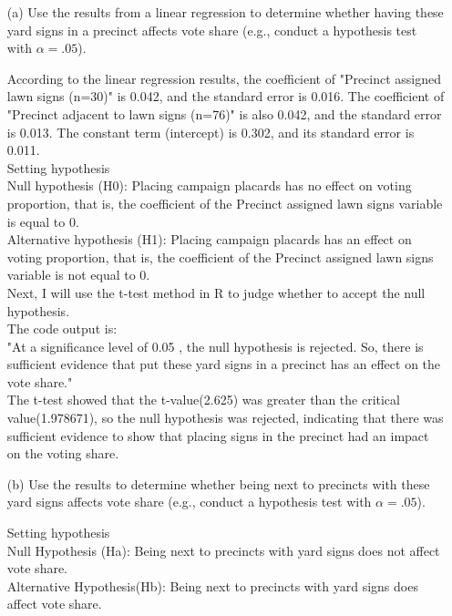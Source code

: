 \documentclass[12pt,letterpaper]{article}
\begin{document}
\vspace{.5cm}
\begin{enumerate}
	\item [(a)] Use the results from a linear regression to determine whether having these yard signs in a precinct affects vote share (e.g., conduct a hypothesis test with $\alpha = .05$).
	
	According to the linear regression results, the coefficient of "Precinct assigned lawn signs (n=30)" is 0.042, and the standard error is 0.016. The coefficient of "Precinct adjacent to lawn signs (n=76)" is also 0.042, and the standard error is 0.013. The constant term (intercept) is 0.302, and its standard error is 0.011.\\
	
	{\large Setting hypothesis\\}
	Null hypothesis (H0): Placing campaign placards has no effect on voting proportion, that is, the coefficient of the Precinct assigned lawn signs variable is equal to 0.\\
	Alternative hypothesis (H1): Placing campaign placards has an effect on voting proportion, that is, the coefficient of the Precinct assigned lawn signs variable is not equal to 0.\\
	
	Next, I will use the t-test method in R to judge whether to accept the null hypothesis.\\
	
	
	The code output is:\\
	
	"At a significance level of  0.05 , the null hypothesis is rejected. So, there is sufficient evidence that put these yard signs in a precinct has an effect on the vote share."\\
	
	The t-test showed that the t-value(2.625) was greater than the critical value(1.978671), so the null hypothesis was rejected, indicating that there was sufficient evidence to show that placing signs in the  precinct had an impact on the voting share.\\
	\newpage		
	\item [(b)]  Use the results to determine whether being
	next to precincts with these yard signs affects vote
	share (e.g., conduct a hypothesis test with $\alpha = .05$).
	
	{\large Setting hypothesis\\}
	Null Hypothesis (H{\small a}): Being next to precincts with yard signs does not affect vote share.\\
	Alternative Hypothesis(H{\small b}): Being next to precincts with yard signs does affect vote share.\\
	

\end{enumerate}
\end{document}
